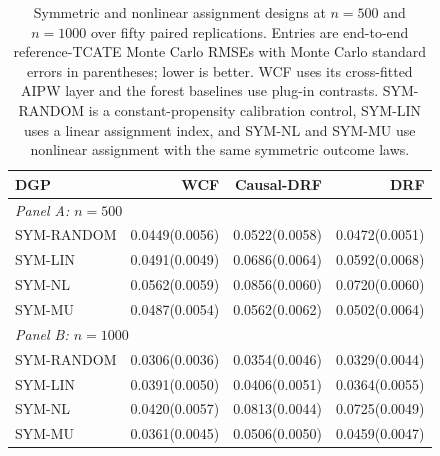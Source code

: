 \begin{table}[!ht]
\centering
\scriptsize
\setlength{\tabcolsep}{3pt}
\caption{Symmetric and nonlinear assignment designs at $n=500$ and $n=1000$ over fifty paired replications. Entries are end-to-end reference-TCATE Monte Carlo RMSEs with Monte Carlo standard errors in parentheses; lower is better. WCF uses its cross-fitted AIPW layer and the forest baselines use plug-in contrasts. SYM-RANDOM is a constant-propensity calibration control, SYM-LIN uses a linear assignment index, and SYM-NL and SYM-MU use nonlinear assignment with the same symmetric outcome laws.}
\label{tab:sensitivity-assignment}
\begin{tabular}{lrrr}
\toprule
DGP & WCF & Causal-DRF & DRF \\
\midrule
\multicolumn{4}{l}{\textit{Panel A: $n=500$}} \\
\midrule
SYM-RANDOM & 0.0449(0.0056) & 0.0522(0.0058) & 0.0472(0.0051) \\
SYM-LIN & 0.0491(0.0049) & 0.0686(0.0064) & 0.0592(0.0068) \\
SYM-NL & 0.0562(0.0059) & 0.0856(0.0060) & 0.0720(0.0060) \\
SYM-MU & 0.0487(0.0054) & 0.0562(0.0062) & 0.0502(0.0064) \\
\multicolumn{4}{l}{\textit{Panel B: $n=1000$}} \\
\midrule
SYM-RANDOM & 0.0306(0.0036) & 0.0354(0.0046) & 0.0329(0.0044) \\
SYM-LIN & 0.0391(0.0050) & 0.0406(0.0051) & 0.0364(0.0055) \\
SYM-NL & 0.0420(0.0057) & 0.0813(0.0044) & 0.0725(0.0049) \\
SYM-MU & 0.0361(0.0045) & 0.0506(0.0050) & 0.0459(0.0047) \\
\bottomrule
\end{tabular}
\end{table}
